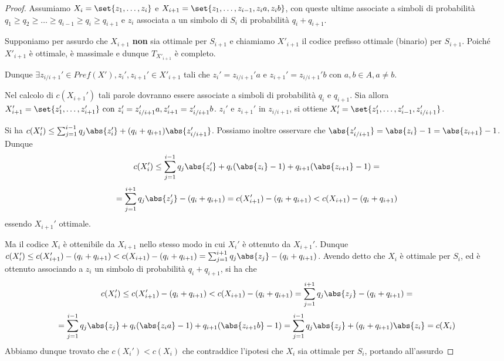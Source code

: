 \begin{proof}
  Assumiamo \(X_i = \set{z_1, \ldots,z_i}\) e \(X_{i+1} = \set{z_1,\ldots,z_{i-1},z_{i}a, z_{i}b}\), con queste ultime associate a simboli di probabilità \(q_1\geq q_2 \geq \ldots \geq q_{i-1} \geq q_i \geq q_{i+1}\) e \(z_i\) associata a un simbolo di \(S_i\) di probabilità \(q_i + q_{i+1}\).
  
  Supponiamo per assurdo che \(X_{i+1}\) \textbf{non} sia ottimale per \(S_{i+1}\) e chiamiamo \(X'_{i+1} \) il codice prefisso ottimale (binario) per \(S_{i+1}\).
  Poiché \(X'_{i+1}\) è ottimale, è massimale e dunque \(T_{X'_{i+1}}\) è completo.

  Dunque \(\exists z_{i/i+1}' \in Pref(X'),z_i', z_{i+1}' \in X'_{i+1}\) tali che \(z_i' = z_{i/i+1}'a\) e \(z_{i+1}' = z_{i/i+1}'b\) con \(a,b \in A, a \neq b\).
  
  Nel calcolo di \(c(X_{i+1}')\) tali parole dovranno essere associate a simboli di probabilità \(q_i\) e \(q_{i+1}\).
  Sia allora \(X_{i+1}' = \set{z_1',\ldots,z_{i+1}'} \text{ con } z_i'=z_{i/i+1}'a,z_{i+1}' = z_{i/i+1}'b\).  $z_i'$ e $z_{i+1}'$ in $z_{i/i+1}$, si ottiene \(X_i' = \set{z_1',\ldots,z_{i-1}', z_{i/i+1}'}\).

  Si ha \(c(X_i') \leq \sum_{j=1}^{i-1} q_j\abs{z_i'} + (q_i+q_{i+1})\abs{z_{i/i+1}'}\).
  Possiamo inoltre osservare che \(\abs{z_{i/i+1}'} = \abs{z_{i}}-1 = \abs{z_{i+1}}-1\).
  Dunque
  \[c(X_i') \leq \sum_{j=1}^{i-1} q_j\abs{z_i'} + q_i(\abs{z_{i}}-1) + q_{i+1}(\abs{z_{i+1}}-1) = \]
  \[=\sum_{j=1}^{i+1} q_j\abs{z_j'} - (q_i + q_{i+1}) = c(X_{i+1}') - (q_i + q_{i+1}) < c(X_{i+1}) - (q_i + q_{i+1})\]
  essendo \(X_{i+1}'\) ottimale.

  Ma il codice \(X_i\) è ottenibile da \(X_{i+1}\) nello stesso modo in cui \(X_i'\) è ottenuto da \(X_{i+1}'\).
  Dunque \(c(X_i') \leq c(X_{i+1}') - (q_i + q_{i+1}) < c(X_{i+1}) - (q_i + q_{i+1}) = \sum_{j=1}^{i+1} q_j\abs{z_j} - (q_i + q_{i+1})\).
  Avendo detto che \(X_i\) è ottimale per \(S_i\), ed è ottenuto associando a \(z_i\) un simbolo di probabilità \(q_i + q_{i+1}\), si ha che
  \[c(X_i') \leq c(X_{i+1}') - (q_i + q_{i+1}) < c(X_{i+1}) - (q_i + q_{i+1}) = \sum_{j=1}^{i+1} q_j\abs{z_j} - (q_i + q_{i+1}) = \]
  \[=\sum_{j=1}^{i-1} q_j\abs{z_j} + q_i(\abs{z_i a}-1) + q_{i+1}(\abs{z_{i+1}b}-1) = \sum_{j=1}^{i-1} q_j\abs{z_j} + (q_i+q_{i+1})\abs{z_{i}} = c(X_i)\]
  Abbiamo dunque trovato che \(c(X_i')<c(X_i)\) che contraddice l'ipotesi che \(X_i\) sia ottimale per \(S_i\), portando all'assurdo
\end{proof}


